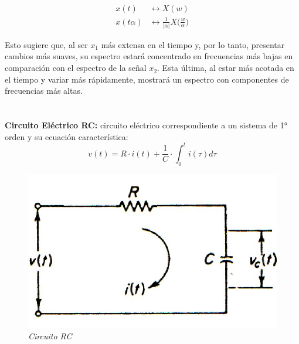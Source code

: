 \documentclass[12pt,a4paper]{report}
\begin{document}
\begin{enumerate}[label=\alph*),left=0pt]
    $$
    \begin{aligned}
      x(t) &\leftrightarrow X(w) \\[6pt]
      x(t\alpha) &\leftrightarrow \frac{1}{|\alpha|}X\Big(\frac{w}{\alpha}\Big)
    \end{aligned}
    $$

    Esto sugiere que, al ser $x_1$ más extensa en el tiempo y, por lo tanto, presentar cambios más suaves, su espectro
    estará concentrado en frecuencias más bajas en comparación con el espectro de la señal $x_2$. Esta última, al estar
    más acotada en el tiempo y variar más rápidamente, mostrará un espectro con componentes de frecuencias más altas.

\end{enumerate}

\chapter{}%

  \textbf{Circuito Eléctrico RC:} circuito eléctrico correspondiente a un sistema de 1° orden y su ecuación
  característica:
  $$v(t) = R\cdot i(t) + \frac{1}{C} \cdot \int_{0}^{t} i(\tau) d\tau$$

  \vspace{-1cm}
  \noindent
  \begin{figure}[h]
    \centering
    \begin{minipage}[h]{0.5\textwidth}
      \centering
      \includegraphics[width=1\textwidth]{./images/ej4.1.jpg}
      \textit{Circuito RC}
    \end{minipage}
  \end{figure}
\end{document}
